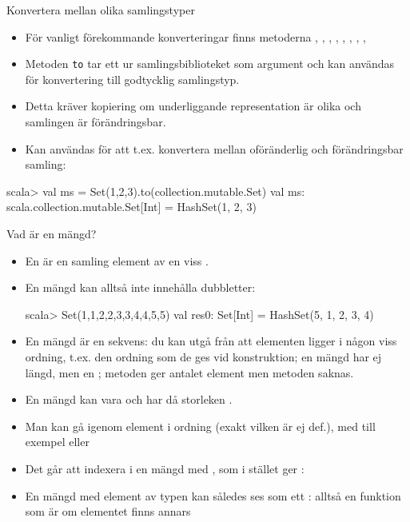 \begin{Slide}{Konvertera mellan olika samlingstyper}
\begin{itemize}
\item För vanligt förekommande konverteringar finns metoderna , ,  , , , , , ,  
\item Metoden \texttt{to} tar ett  ur samlingsbiblioteket som argument och kan användas för konvertering till godtycklig samlingstyp.
\item Detta kräver kopiering om underliggande representation är olika och samlingen är förändringsbar.
\item Kan användas för att t.ex. konvertera mellan oföränderlig och förändringsbar samling:
\end{itemize}
\begin{REPLnonum}
scala> val ms = Set(1,2,3).to(collection.mutable.Set)
val ms: scala.collection.mutable.Set[Int] = HashSet(1, 2, 3)
\end{REPLnonum}
\end{Slide}




\begin{Slide}{Vad är en mängd?}\SlideFontSmall
\begin{itemize}
\item En  är en samling  element av en viss .
\item En mängd kan alltså inte innehålla dubbletter:
\begin{REPLnonum}
scala> Set(1,1,2,2,3,3,4,4,5,5)
val res0: Set[Int] = HashSet(5, 1, 2, 3, 4)
\end{REPLnonum}
\pause
\item En mängd är   en sekvens: du kan  utgå från att elementen ligger i någon viss ordning, t.ex. den ordning som de ges vid konstruktion; en mängd har ej längd, men en ; metoden  ger antalet element men metoden  saknas.
\item En mängd kan vara  och har då storleken .
\pause
\item Man kan gå igenom element i  ordning (exakt vilken är ej def.), med till exempel  eller 
\pause
\item Det går  att indexera i en mängd med , som i stället ger : 
\item En mängd  med element av typen  kan således ses som ett : alltså en funktion  som är  om elementet finns annars 
\end{itemize}
\end{Slide}


